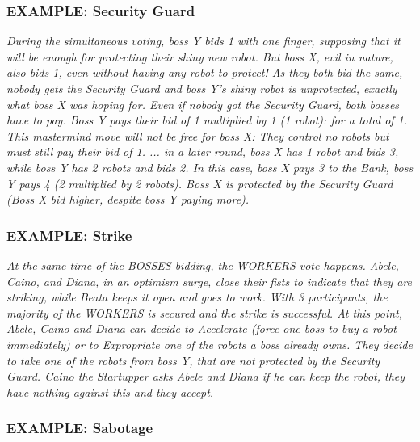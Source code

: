         \subsubsection{EXAMPLE: Security Guard}

            \textit{During the simultaneous voting, boss Y bids 1 with one finger, supposing that it will
            be enough for protecting their shiny new robot. But boss X, evil in nature, also bids
            1, even without having any robot to protect! As they both bid the same, nobody
            gets the Security Guard and boss Y's shiny robot is unprotected, exactly what boss
            X was hoping for. Even if nobody got the Security Guard, both bosses have to pay.
            Boss Y pays their bid of 1 multiplied by 1 (1 robot): for a total of 1. This mastermind
            move will not be free for boss X: They control no robots but must still pay their bid
            of 1.\newline
            ... in a later round, boss X has 1 robot and bids 3, while boss Y has 2 robots and bids
            2. In this case, boss X pays 3 to the Bank, boss Y pays 4 (2 multiplied by 2 robots).
            Boss X is protected by the Security Guard (Boss X bid higher, despite boss Y paying
            more).}

        \subsubsection{EXAMPLE: Strike}

            \textit{At the same time of the BOSSES bidding, the WORKERS vote happens. Abele, Caino,
            and Diana, in an optimism surge, close their fists to indicate that they are striking,
            while Beata keeps it open and goes to work. With 3 participants, the majority of
            the WORKERS is secured and the strike is successful. At this point, Abele, Caino and
            Diana can decide to Accelerate (force one boss to buy a robot immediately) or to
            Expropriate one of the robots a boss already owns. They decide to take one of the
            robots from boss Y, that are not protected by the Security Guard. Caino the Startupper
            asks Abele and Diana if he can keep the robot, they have nothing against this
            and they accept.}

        \subsubsection{EXAMPLE: Sabotage}

